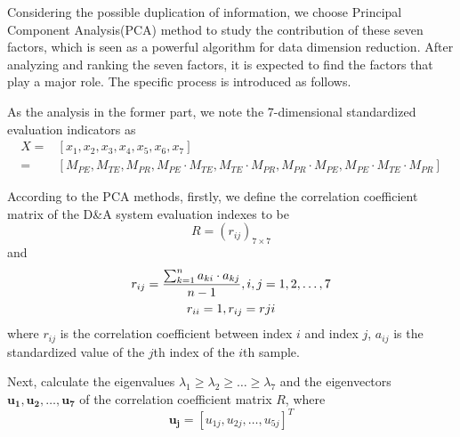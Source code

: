 \documentclass{mcmthesis}
\begin{document}
Considering the possible duplication of information, we choose Principal Component Analysis(PCA) method to study the contribution of these seven factors, which is seen as a powerful algorithm for data dimension reduction. After analyzing and ranking the seven factors, it is expected to find the factors that play a major role. The specific process is introduced as follows.

As the analysis in the former part, we note the 7-dimensional standardized evaluation indicators as
\begin{equation}
    \begin{split}
    X =& [x_1,x_2,x_3,x_4,x_5,x_6,x_7] \\
    =& [M_{PE},M_{TE},M_{PR},M_{PE} \cdot M_{TE},M_{TE} \cdot M_{PR},M_{PR} \cdot M_{PE},M_{PE} \cdot M_{TE} \cdot M_{PR}]
    \end{split}
\end{equation}

According to the PCA methods\cite{4}, firstly, we define the correlation coefficient matrix of the D\&A system evaluation indexes to be
\begin{equation}
    R = (r_{ij})_{7 \times 7}
\end{equation}
and
\begin{gather}
    r_{ij} = \frac{\sum_{k=1}^n a_{ki} \cdot a_{kj}}{n-1},i,j=1,2,\dots,7 \\
    r_{ii}=1,r_{ij}=r{ji} \notag
\end{gather}
where $r_{ij}$ is the correlation coefficient between index $i$ and index $j$, $a_{ij}$ is the standardized value of the $j$th index of the $i$th sample.

Next, calculate the eigenvalues $\lambda_1 \geqslant \lambda_2 \geqslant \dots \geqslant \lambda_7$ and the eigenvectors $\mathbf{u_1},\mathbf{u_2},\dots,\mathbf{u_7}$ of the correlation coefficient matrix $R$, where
\begin{equation}
    \mathbf{u_j}=[u_{1j},u_{2j},\dots,u_{5j}]^T
\end{equation}
\end{document}
